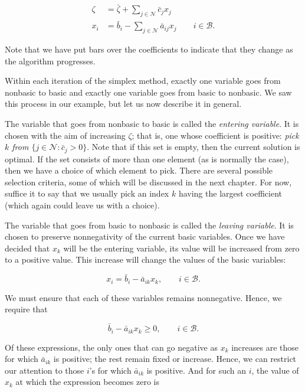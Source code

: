 \documentclass{article}
\begin{document}
    \begin{equation}\label{eq:2.6}
    \begin{split}
    \zeta &= \bar{\zeta} + \sum_{j \in \mathcal{N}} \bar{c}_{j}x_{j} \\
    x_{i} &= \bar{b}_{i} - \sum_{j \in \mathcal{N}} \bar{a}_{ij}x_{j} \qquad i \in \mathcal{B}.
    \end{split}
    \end{equation}
    
    Note that we have put bars over the coefficients to indicate that they change as the algorithm progresses.
    
    Within each iteration of the simplex method, exactly one variable goes from nonbasic to basic and exactly one variable goes from basic to nonbasic. We saw this process in our example, but let us now describe it in general.
    
    The variable that goes from nonbasic to basic is called the \emph{entering variable}. It is chosen with the aim of increasing \( \zeta \); that is, one whose coefficient is positive: \emph{pick \( k \) from \( \{j \in \mathcal{N} : \bar{c}_{j} > 0\} \)}. Note that if this set is empty, then the current solution is optimal. If the set consists of more than one element (as is normally the case), then we have a choice of which element to pick. There are several possible selection criteria, some of which will be discussed in the next chapter. For now, suffice it to say that we usually pick an index \( k \) having the largest coefficient (which again could leave us with a choice).
    
    The variable that goes from basic to nonbasic is called the \emph{leaving variable}. It is chosen to preserve nonnegativity of the current basic variables. Once we have decided that \( x_{k} \) will be the entering variable, its value will be increased from zero to a positive value. This increase will change the values of the basic variables:
    
    \[ x_{i} = \bar{b}_{i} - \bar{a}_{ik}x_{k}, \qquad i \in \mathcal{B}. \]
    
    We must ensure that each of these variables remains nonnegative. Hence, we require that
    
    \begin{equation}\label{eq:2.7}
    \bar{b}_{i} - \bar{a}_{ik}x_{k} \geq 0, \qquad i \in \mathcal{B}.
    \end{equation}
    
    Of these expressions, the only ones that can go negative as \( x_{k} \) increases are those for which \( \bar{a}_{ik} \) is positive; the rest remain fixed or increase. Hence, we can restrict our attention to those \( i \)'s for which \( \bar{a}_{ik} \) is positive. And for such an \( i \), the value of \( x_{k} \) at which the expression becomes zero is
    
\end{document}
